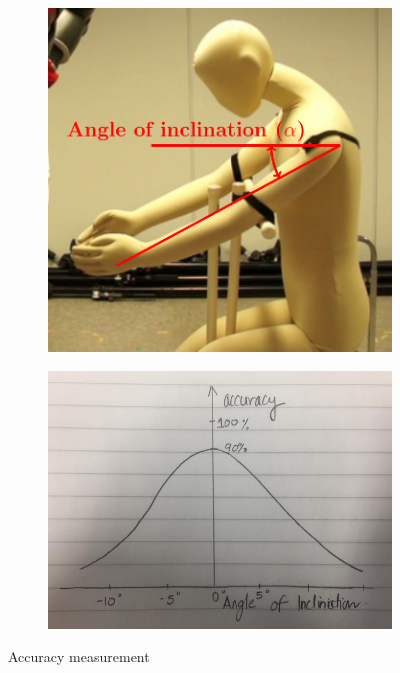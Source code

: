 \documentclass[sigconf]{acmart}
\begin{document}
\begin{figure}
	\centering
	\begin{subfigure}{.2\textwidth}
		\includegraphics[width=\linewidth]{inclination}
	\end{subfigure}%
	\begin{subfigure}{.26\textwidth}
		\includegraphics[width=\linewidth]{accuracy}
	\end{subfigure}
	\caption{Accuracy measurement}
	\label{accuracy}
\end{figure}
\end{document}
